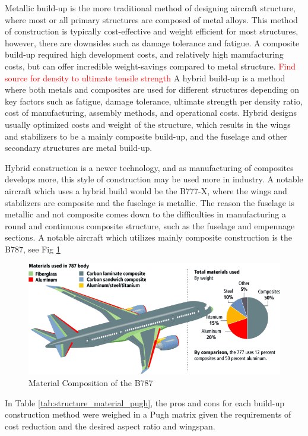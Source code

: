 Metallic build-up is the more traditional method of designing aircraft structure, where most or all primary structures are composed of metal alloys. This method of construction is typically cost-effective and weight efficient for most structures, however, there are downsides such as damage tolerance and fatigue. A composite build-up required high development costs, and relatively high manufacturing costs, but can offer incredible weight-savings compared to metal structure. \textcolor{red}{Find source for density to ultimate tensile strength} A hybrid build-up is a method where both metals and composites are used for different structures depending on key factors such as fatigue, damage tolerance, ultimate strength per density ratio, cost of manufacturing, assembly methods, and operational costs. Hybrid designs usually optimized costs and weight of the structure, which results in the wings and stabilizers to be a mainly composite build-up, and the fuselage and other secondary structures are metal build-up. 

Hybrid construction is a newer technology, and as manufacturing of composites develops more, this style of construction may be used more in industry. A notable aircraft which uses a hybrid build would be the B777-X, where the wings and stabilizers are composite and the fuselage is metallic. The reason the fuselage is metallic and not composite comes down to the difficulties in manufacturing a round and continuous composite structure, such as the fuselage and empennage sections. A notable aircraft which utilizes mainly composite construction is the B787, see Fig \ref{fig:787 materials}

\begin{figure}[!h]
    \centering
    \includegraphics[width=\linewidth]{Photos/787 Materials.png}
    \caption{Material Composition of the B787}
    \label{fig:787 materials}
\end{figure}

In Table \ref{tab:structure_material_pugh}, the pros and cons for each build-up construction method were weighed in a Pugh matrix given the requirements of cost reduction and the desired aspect ratio and wingspan.


